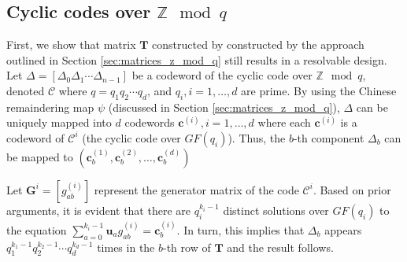 \documentclass[journal,twocolumn]{IEEEtran}
\theoremstyle{definition}
\newcommand{\calC}{\mathcal{C}}
\newcommand{\calP}{\mathcal{P}}
\newcommand{\calS}{\mathcal{S}}
\newcommand{\bfu}{\mathbf{u}}
\newcommand{\bfc}{\mathbf{c}}
\newcommand{\bfT}{\mathbf{T}}
\newcommand{\bfG}{\mathbf{G}}
\begin{document}
\subsection{Cyclic codes over $\mathbb{Z} \mod q$ \cite{blake1972codes}}
\label{sec:blake_codes}
%
%
%
First, we show that matrix $\bfT$ constructed by constructed by the approach outlined in Section \ref{sec:matrices_z_mod_q} still results in a resolvable design. Let $\Delta=[\Delta_0 \Delta_1 \cdots \Delta_{n-1}]$ be a codeword of the cyclic code over $\mathbb{Z}\mod q$, denoted $\calC$ where $q=q_1q_2\cdots q_d$, and $q_i, i = 1, \dots, d$ are prime. By using the Chinese remaindering map $\psi$ (discussed in Section \ref{sec:matrices_z_mod_q}), $\Delta$ can be uniquely mapped into $d$ codewords $\bfc^{(i)}, i = 1, \dots, d$ where each $\bfc^{(i)}$ is a codeword of $\calC^i$ (the cyclic code over $GF(q_i)$). Thus, the $b$-th component $\Delta_b$ can be mapped to $(\bfc^{(1)}_{b}, \bfc^{(2)}_{b}, \dots, \bfc^{(d)}_{b})$

Let $\bfG^i=[g_{ab}^{(i)}]$ represent the generator matrix of the code $\calC^i$. Based on prior arguments, it is evident that there are $q_i^{k_i-1}$ distinct solutions over $GF(q_i)$ to the equation $\sum_{a=0}^{k_i-1}\bfu_a g_{ab}^{(i)}= \bfc^{(i)}_{b}$. In turn, this implies that $\Delta_b$ appears $q_1^{k_1-1}q_2^{k_2-1}\cdots q_d^{k_d-1}$ times in the $b$-th row of $\bfT$ and the result follows.
%
%
\end{document}
